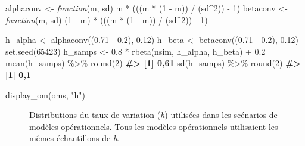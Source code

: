 \documentclass[french,11pt]{book}
\newenvironment{Shaded}{\begin{snugshade}}{\end{snugshade}}
\newcommand{\CommentTok}[1]{\textcolor[rgb]{0.56,0.35,0.01}{\textbf{#1}}}
\newcommand{\ControlFlowTok}[1]{\textcolor[rgb]{0.13,0.29,0.53}{\textit{#1}}}
\newcommand{\DecValTok}[1]{\textcolor[rgb]{0.00,0.00,0.81}{#1}}
\newcommand{\FloatTok}[1]{\textcolor[rgb]{0.00,0.00,0.81}{#1}}
\newcommand{\FunctionTok}[1]{\textcolor[rgb]{0.00,0.00,0.00}{#1}}
\newcommand{\NormalTok}[1]{#1}
\newcommand{\OtherTok}[1]{\textcolor[rgb]{0.56,0.35,0.01}{#1}}
\newcommand{\SpecialCharTok}[1]{\textcolor[rgb]{0.00,0.00,0.00}{#1}}
\newcommand{\StringTok}[1]{\textcolor[rgb]{0.31,0.60,0.02}{#1}}
\begin{document}
\begin{Shaded}
\begin{Highlighting}[]
\NormalTok{alphaconv }\OtherTok{\textless{}{-}} \ControlFlowTok{function}\NormalTok{(m, sd) m }\SpecialCharTok{*}\NormalTok{ (((m }\SpecialCharTok{*}\NormalTok{ (}\DecValTok{1} \SpecialCharTok{{-}}\NormalTok{ m)) }\SpecialCharTok{/}\NormalTok{ (sd}\SpecialCharTok{\^{}}\DecValTok{2}\NormalTok{)) }\SpecialCharTok{{-}} \DecValTok{1}\NormalTok{)}
\NormalTok{betaconv }\OtherTok{\textless{}{-}} \ControlFlowTok{function}\NormalTok{(m, sd) (}\DecValTok{1} \SpecialCharTok{{-}}\NormalTok{ m) }\SpecialCharTok{*}\NormalTok{ (((m }\SpecialCharTok{*}\NormalTok{ (}\DecValTok{1} \SpecialCharTok{{-}}\NormalTok{ m)) }\SpecialCharTok{/}\NormalTok{ (sd}\SpecialCharTok{\^{}}\DecValTok{2}\NormalTok{)) }\SpecialCharTok{{-}} \DecValTok{1}\NormalTok{)}

\NormalTok{h\_alpha }\OtherTok{\textless{}{-}} \FunctionTok{alphaconv}\NormalTok{((}\FloatTok{0.71} \SpecialCharTok{{-}} \FloatTok{0.2}\NormalTok{), }\FloatTok{0.12}\NormalTok{)}
\NormalTok{h\_beta }\OtherTok{\textless{}{-}} \FunctionTok{betaconv}\NormalTok{((}\FloatTok{0.71} \SpecialCharTok{{-}} \FloatTok{0.2}\NormalTok{), }\FloatTok{0.12}\NormalTok{)}
\FunctionTok{set.seed}\NormalTok{(}\DecValTok{65423}\NormalTok{)}
\NormalTok{h\_samps }\OtherTok{\textless{}{-}} \FloatTok{0.8} \SpecialCharTok{*} \FunctionTok{rbeta}\NormalTok{(nsim, h\_alpha, h\_beta) }\SpecialCharTok{+} \FloatTok{0.2}
\FunctionTok{mean}\NormalTok{(h\_samps) }\SpecialCharTok{\%\textgreater{}\%} \FunctionTok{round}\NormalTok{(}\DecValTok{2}\NormalTok{)}
\CommentTok{\#\textgreater{} [1] 0,61}
\FunctionTok{sd}\NormalTok{(h\_samps) }\SpecialCharTok{\%\textgreater{}\%} \FunctionTok{round}\NormalTok{(}\DecValTok{2}\NormalTok{)}
\CommentTok{\#\textgreater{} [1] 0,1}
\end{Highlighting}
\end{Shaded}
\begin{Shaded}
\end{Shaded}
\begin{Shaded}
\begin{Highlighting}[]
\FunctionTok{display\_om}\NormalTok{(oms, }\StringTok{"h"}\NormalTok{)}
\end{Highlighting}
\end{Shaded}
\begin{figure}[htb]

{\centering {} 

}

\caption{Distributions du taux de variation (\emph{h}) utilisées dans les scénarios de modèles opérationnels. Tous les modèles opérationnels utilisaient les mêmes échantillons de \emph{h}.}\label{fig:desc-stock-h-yelloweye}
\end{figure}
\end{document}
